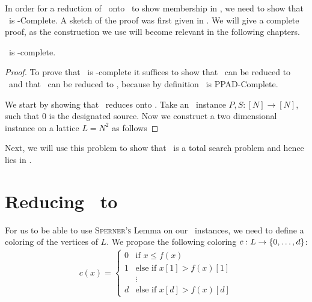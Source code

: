 
In order for a reduction of \Tarskistar\ onto \Sperner\ to show membership in \PPAD, we need to show that \Sperner\ is \PPAD-Complete. A sketch of the proof was first given in . We will give a complete proof, as the construction we use will become relevant in the following chapters.
\begin{theorem}
	\Sperner\ is \PPAD-complete.
\end{theorem}
\begin{proof}
	To prove that \Sperner\ is \PPAD-complete it suffices to show that \Sperner\ can be reduced to \EndOfLine\ and that \EndOfLine\ can be reduced to \Sperner, because by definition \EndOfLine\ is PPAD-Complete.

	We start by showing that \EndOfLine\ reduces onto \Sperner. Take an \EndOfLine\ instance $P, S : [N] \rightarrow [N]$, such that $0$ is the designated source. Now we construct a two dimensional \Sperner instance on a lattice $L = N^2$ as follows

\end{proof}


Next, we will use this problem to show that \Tarskistar\ is a total search problem and hence lies in \PPAD.

\section{Reducing \Tarskistar\ to \Sperner}
\label{sec:tarskistar_to_sperner}

For us to be able to use \textsc{Sperner's} Lemma on our \Tarskistar\ instances, we need to define a coloring of the vertices of $L$. We propose the following coloring $c : L \rightarrow \left\{0, \dots, d\right\}$:
\begin{align*}
	c(x) =
	\begin{cases}
		0 & \text{if $x \leq f(x)$}         \\
		1 & \text{else if $x[1] > f(x)[1]$} \\
		  & \vdots                          \\
		d & \text{else if $x[d] > f(x)[d]$}
	\end{cases}
\end{align*}


